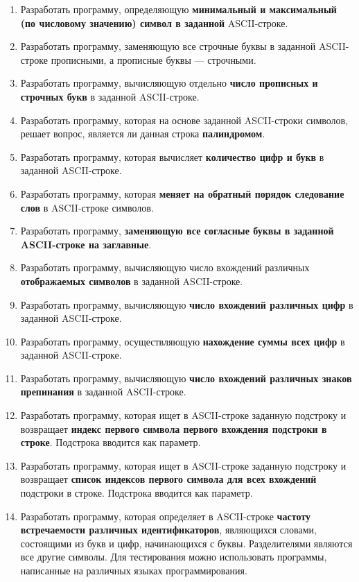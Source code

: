 \documentclass[a4paper, 12pt, oneside]{article}
\begin{document}
\begin{enumerate}
    \item Разработать программу, определяющую \textbf{минимальный и максимальный (по числовому значению) символ в заданной} ASCII-строке.
    \item Разработать программу, заменяющую все строчные буквы в заданной ASCII-строке прописными, а прописные буквы --- строчными.
    \item Разработать программу, вычисляющую отдельно \textbf{число прописных и строчных букв} в заданной ASCII-строке.
    \item Разработать программу, которая на основе заданной ASCII-строки символов, решает вопрос, является ли данная строка \textbf{палиндромом}.
    \item Разработать программу, которая вычисляет \textbf{количество цифр и букв} в заданной ASCII-строке.
    \item Разработать программу, которая \textbf{меняет на обратный порядок следование слов} в ASCII-строке символов.
    \item Разработать программу, \textbf{заменяющую все согласные буквы в заданной ASCII-строке на заглавные}.
    \item Разработать программу, вычисляющую число вхождений различных \textbf{отображаемых символов} в заданной ASCII-строке.
    \item Разработать программу, вычисляющую \textbf{число вхождений различных цифр} в заданной ASCII-строке.
    \item Разработать программу, осуществляющую \textbf{нахождение суммы всех цифр} в заданной ASCII-строке.
    \item Разработать программу, вычисляющую \textbf{число вхождений различных знаков препинания} в заданной ASCII-строке.
    \item Разработать программу, которая ищет в ASCII-строке заданную подстроку и возвращает \textbf{индекс первого символа первого вхождения подстроки в строке}. Подстрока вводится как параметр.
    \item Разработать программу, которая ищет в ASCII-строке заданную подстроку и возвращает \textbf{список индексов первого символа для всех вхождений} подстроки в строке. Подстрока вводится как параметр.
    \item Разработать программу, которая определяет в ASCII-строке \textbf{частоту встречаемости различных идентификаторов}, являющихся словами, состоящими из букв и цифр, начинающихся с буквы. Разделителями являются все другие символы. Для тестирования можно использовать программы, написанные на различных языках программирования.

\end{enumerate}
\end{document}
